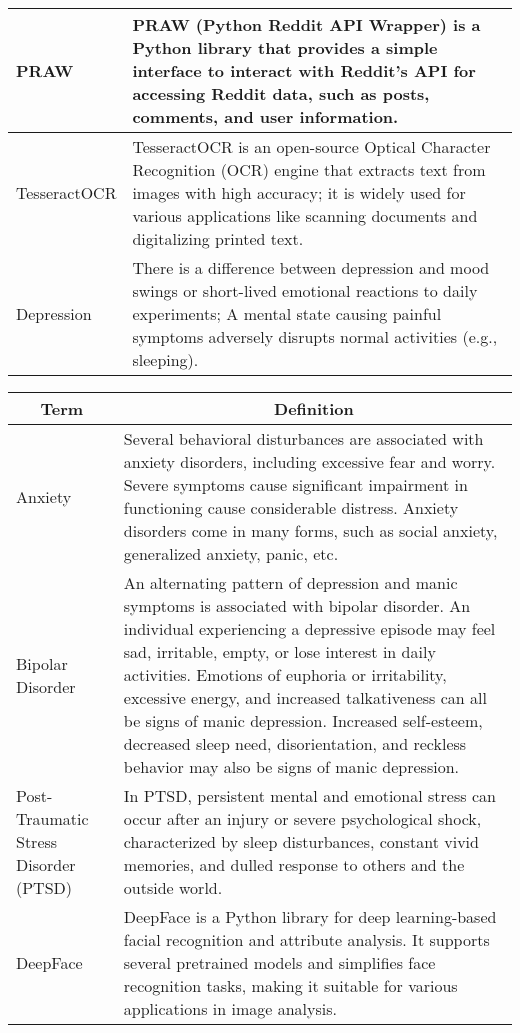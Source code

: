 \begin{center}
\begin{tabular}{|p{4cm}|p{10cm}|}
  \hline
  PRAW & PRAW (Python Reddit API Wrapper) is a Python library that provides a simple interface to interact with Reddit's API for accessing Reddit data, such as posts, comments, and user information. \\
  \hline
  TesseractOCR & TesseractOCR is an open-source Optical Character Recognition (OCR) engine that extracts text from images with high accuracy; it is widely used for various applications like scanning documents and digitalizing printed text. \\
  \hline
  Depression & There is a difference between depression and mood swings or short-lived emotional reactions to daily experiments; A mental state causing painful symptoms adversely disrupts normal activities (e.g., sleeping). \\
  \hline
\end{tabular}

\begin{tabular}{|p{4cm}|p{10cm}|}
    \hline
    \multicolumn{1}{|c|}{\textbf{Term}} & \multicolumn{1}{c|}{\textbf{Definition}} \\

  \hline
  Anxiety & Several behavioral disturbances are associated with anxiety disorders, including excessive fear and worry. Severe symptoms cause significant impairment in functioning cause considerable distress. Anxiety disorders come in many forms, such as social anxiety, generalized anxiety, panic, etc. \\

  \hline
  Bipolar Disorder & An alternating pattern of depression and manic symptoms is associated with bipolar disorder. An individual experiencing a depressive episode may feel sad, irritable, empty, or lose interest in daily activities. Emotions of euphoria or irritability, excessive energy, and increased talkativeness can all be signs of manic depression. Increased self-esteem, decreased sleep need, disorientation, and reckless behavior may also be signs of manic depression. \\

  \hline
  Post-Traumatic Stress Disorder (PTSD) & In PTSD, persistent mental and emotional stress can occur after an injury or severe psychological shock, characterized by sleep disturbances, constant vivid memories, and dulled response to others and the outside world. \\

  \hline
  DeepFace & DeepFace is a Python library for deep learning-based facial recognition and attribute analysis. It supports several pretrained models and simplifies face recognition tasks, making it suitable for various applications in image analysis. \\


\end{tabular}
\end{center}
